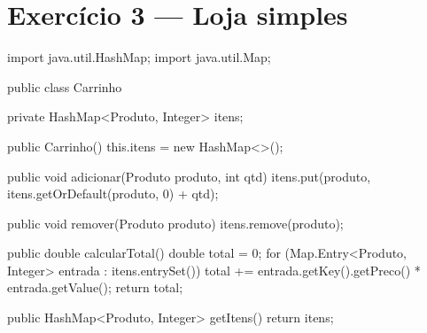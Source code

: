 \documentclass[11pt,a4paper]{article}
\begin{document}
\section{Exercício 3 --- Loja simples}


\begin{javacode}
import java.util.HashMap;
import java.util.Map;

public class Carrinho {
    private HashMap<Produto, Integer> itens;

    public Carrinho() {
        this.itens = new HashMap<>();
    }

    public void adicionar(Produto produto, int qtd) {
        itens.put(produto, itens.getOrDefault(produto, 0) + qtd);
    }

    public void remover(Produto produto) {
        itens.remove(produto);
    }

    public double calcularTotal() {
        double total = 0;
        for (Map.Entry<Produto, Integer> entrada : itens.entrySet()) {
            total += entrada.getKey().getPreco() * entrada.getValue();
        }
        return total;
    }

    public HashMap<Produto, Integer> getItens() {
        return itens;
    }
}
\end{javacode}
\end{document}
